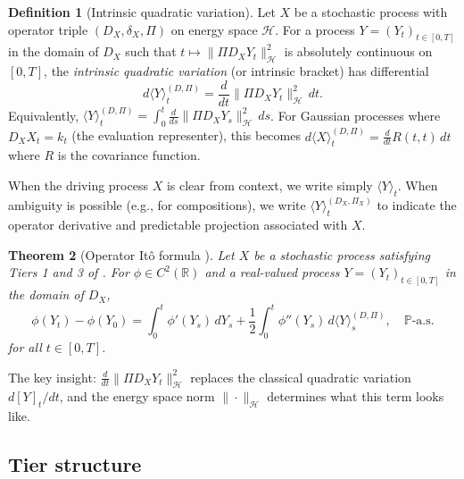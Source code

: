 \documentclass[12pt]{article}
\theoremstyle{plain}
\newtheorem{theorem}{Theorem}[section]
\theoremstyle{definition}
\newtheorem{definition}[theorem]{Definition}
\theoremstyle{remark}
\newcommand{\R}{\mathbb{R}}
\newcommand{\PP}{\mathbb{P}}
\newcommand{\HH}{\mathcal{H}}
\begin{document}
\begin{definition}[Intrinsic quadratic variation]\label{def:intrinsic-bracket}
Let $X$ be a stochastic process with operator triple $(D_X, \delta_X, \Pi)$ on energy space $\HH$. For a process $Y = (Y_t)_{t \in [0,T]}$ in the domain of $D_X$ such that $t \mapsto \|\Pi D_X Y_t\|_{\HH}^2$ is absolutely continuous on $[0,T]$, the \emph{intrinsic quadratic variation} (or intrinsic bracket) has differential
\begin{equation}\label{eq:intrinsic-bracket}
d\langle Y \rangle_t^{(D,\Pi)} = \frac{d}{dt}\|\Pi D_X Y_t\|_{\HH}^2 \, dt.
\end{equation}
Equivalently, $\langle Y \rangle_t^{(D,\Pi)} = \int_0^t \frac{d}{ds}\|\Pi D_X Y_s\|_{\HH}^2 \, ds$. For Gaussian processes where $D_X X_t = k_t$ (the evaluation representer), this becomes $d\langle X \rangle_t^{(D,\Pi)} = \frac{d}{dt}R(t,t) \, dt$ where $R$ is the covariance function.

When the driving process $X$ is clear from context, we write simply $\langle Y \rangle_t$. When ambiguity is possible (e.g., for compositions), we write $\langle Y \rangle_t^{(D_X, \Pi_X)}$ to indicate the operator derivative and predictable projection associated with $X$.
\end{definition}

\begin{theorem}[Operator It\^{o} formula {\cite{Fontes2026c}}]\label{thm:operator-ito}
Let $X$ be a stochastic process satisfying Tiers 1 and 3 of \cite{Fontes2026d}. For $\phi \in C^2(\R)$ and a real-valued process $Y = (Y_t)_{t \in [0,T]}$ in the domain of $D_X$,
\begin{equation}\label{eq:operator-ito}
\phi(Y_t) - \phi(Y_0) = \int_0^t \phi'(Y_s)\,dY_s + \frac{1}{2}\int_0^t \phi''(Y_s)\,d\langle Y \rangle_s^{(D,\Pi)}, \quad \PP\text{-a.s.}
\end{equation}
for all $t \in [0,T]$.
\end{theorem}

The key insight: $\frac{d}{dt}\|\Pi D_X Y_t\|_{\HH}^2$ replaces the classical quadratic variation $d[Y]_t/dt$, and the energy space norm $\|\cdot\|_{\HH}$ determines what this term looks like.

\subsection{Tier structure}
\end{document}
